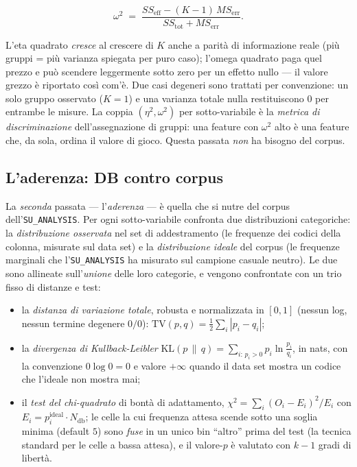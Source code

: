 \begin{equation}
  \omega^2 \;=\; \frac{SS_{\text{eff}} - (K-1)\,MS_{\text{err}}}{SS_{\text{tot}} + MS_{\text{err}}}.
  \label{eq:omega2}
\end{equation}

L'eta quadrato \emph{cresce} al crescere di $K$ anche a parità di informazione
reale (più gruppi = più varianza spiegata per puro caso); l'omega quadrato
paga quel prezzo e può scendere leggermente sotto zero per un effetto nullo —
il valore grezzo è riportato così com'è. Due casi degeneri sono trattati per
convenzione: un solo gruppo osservato ($K = 1$) e una varianza totale nulla
restituiscono $0$ per entrambe le misure. La coppia $(\eta^2, \omega^2)$ per
sotto-variabile è la \emph{metrica di discriminazione} dell'assegnazione di
gruppi: una feature con $\omega^2$ alto è una feature che, da sola, ordina il
valore di gioco. Questa passata \emph{non} ha bisogno del corpus.

\subsection{L'aderenza: DB contro corpus}

La \emph{seconda} passata — l'\emph{aderenza} — è quella che si nutre del
corpus dell'\texttt{SU\_ANALYSIS}. Per ogni sotto-variabile confronta due
distribuzioni categoriche: la \emph{distribuzione osservata} nel set di
addestramento (le frequenze dei codici della colonna, misurate sul data set)
e la \emph{distribuzione ideale} del corpus (le frequenze marginali che
l'\texttt{SU\_ANALYSIS} ha misurato sul campione casuale neutro). Le due sono
allineate sull'\emph{unione} delle loro categorie, e vengono confrontate con
un trio fisso di distanze e test:

\begin{itemize}
  \item la \emph{distanza di variazione totale}, robusta e normalizzata in
        $[0,1]$ (nessun log, nessun termine degenere $0/0$):
        $\mathrm{TV}(p,q) = \tfrac{1}{2}\sum_i |p_i - q_i|$;
  \item la \emph{divergenza di Kullback-Leibler}
        $\mathrm{KL}(p\,\|\,q) = \sum_{i:\,p_i>0} p_i \ln \frac{p_i}{q_i}$,
        in nats, con la convenzione $0\log 0 = 0$ e valore $+\infty$ quando il
        data set mostra un codice che l'ideale non mostra mai;
  \item il \emph{test del chi-quadrato} di bontà di adattamento,
        $\chi^2 = \sum_i (O_i - E_i)^2 / E_i$ con $E_i = p^{\text{ideal}}_i
        \cdot N_{\text{db}}$; le celle la cui frequenza attesa scende sotto una
        soglia minima (default $5$) sono \emph{fuse} in un unico bin ``altro''
        prima del test (la tecnica standard per le celle a bassa attesa), e il
        valore-$p$ è valutato con $k-1$ gradi di libertà.
\end{itemize}

